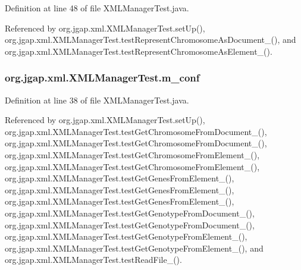 Definition at line 48 of file X\-M\-L\-Manager\-Test.\-java.



Referenced by org.\-jgap.\-xml.\-X\-M\-L\-Manager\-Test.\-set\-Up(), org.\-jgap.\-xml.\-X\-M\-L\-Manager\-Test.\-test\-Represent\-Chromosome\-As\-Document\-\_(), and org.\-jgap.\-xml.\-X\-M\-L\-Manager\-Test.\-test\-Represent\-Chromosome\-As\-Element\-\_().

\hypertarget{classorg_1_1jgap_1_1xml_1_1_x_m_l_manager_test_a88cbd0937879e8c66e9cc0948b40473c}{
\subsubsection[{m\-\_\-conf}]{ org.\-jgap.\-xml.\-X\-M\-L\-Manager\-Test.\-m\-\_\-conf\hspace{0.3cm}{\ttfamily [private]}}}\label{classorg_1_1jgap_1_1xml_1_1_x_m_l_manager_test_a88cbd0937879e8c66e9cc0948b40473c}


Definition at line 38 of file X\-M\-L\-Manager\-Test.\-java.



Referenced by org.\-jgap.\-xml.\-X\-M\-L\-Manager\-Test.\-set\-Up(), org.\-jgap.\-xml.\-X\-M\-L\-Manager\-Test.\-test\-Get\-Chromosome\-From\-Document\-\_(), org.\-jgap.\-xml.\-X\-M\-L\-Manager\-Test.\-test\-Get\-Chromosome\-From\-Document\-\_(), org.\-jgap.\-xml.\-X\-M\-L\-Manager\-Test.\-test\-Get\-Chromosome\-From\-Element\-\_(), org.\-jgap.\-xml.\-X\-M\-L\-Manager\-Test.\-test\-Get\-Chromosome\-From\-Element\-\_(), org.\-jgap.\-xml.\-X\-M\-L\-Manager\-Test.\-test\-Get\-Genes\-From\-Element\-\_(), org.\-jgap.\-xml.\-X\-M\-L\-Manager\-Test.\-test\-Get\-Genes\-From\-Element\-\_(), org.\-jgap.\-xml.\-X\-M\-L\-Manager\-Test.\-test\-Get\-Genes\-From\-Element\-\_(), org.\-jgap.\-xml.\-X\-M\-L\-Manager\-Test.\-test\-Get\-Genotype\-From\-Document\-\_(), org.\-jgap.\-xml.\-X\-M\-L\-Manager\-Test.\-test\-Get\-Genotype\-From\-Document\-\_(), org.\-jgap.\-xml.\-X\-M\-L\-Manager\-Test.\-test\-Get\-Genotype\-From\-Element\-\_(), org.\-jgap.\-xml.\-X\-M\-L\-Manager\-Test.\-test\-Get\-Genotype\-From\-Element\-\_(), and org.\-jgap.\-xml.\-X\-M\-L\-Manager\-Test.\-test\-Read\-File\-\_().


